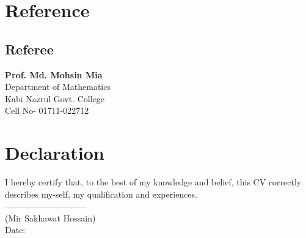 \documentclass[letterpaper]{twentysecondcv} %
\begin{document}

\newpage %

\makeprofile %

\section{Reference}
\subsection{Referee}
\textbf{Prof. Md. Mohsin Mia}\\
Department of Mathematics\\
Kabi Nazrul Govt. College\\
Cell No- 01711-022712\\

\section{Declaration}


I hereby certify that, to the best of my knowledge and belief, this CV correctly\\ describes my-self, my qualification and experiences.\\


-----------------------------\\
(Mir Sakhawat Hossain)\\
Date:


\end{document}
